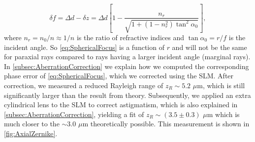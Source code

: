 \begin{equation}\label{eq:SphericalFocus}
    \delta f = \Delta d - \delta z = \Delta d \left[
    1 - \frac{n_r}{\sqrt{1+(1-n_r^2)\tan^2{\alpha_0}}}
    \right],
\end{equation}
where $n_r=n_0/n\approx1/n$ is the ratio of refractive indices and $\tan{\alpha_0} = r/f$ is the incident angle. 
So \cref{eq:SphericalFocus} is a function of $r$ and will not be the same for paraxial rays compared to rays having a larger incident angle (marginal rays). 
In \cref{subsec:AberrationCorrection} we explain how we computed the corresponding phase error of \cref{eq:SphericalFocus}, which we corrected using the \ac{SLM}.
After correction, we measured a reduced Rayleigh range of $z_R \sim 5.2$ $\mu$m, which is still significantly larger than the result from theory. 
Subsequently, we applied an extra cylindrical lens to the SLM to correct astigmatism, which is also explained in \cref{subsec:AberrationCorrection}, yielding a fit of $z_R \sim (3.5 \pm 0.3)$ $\mu$m which is much closer to the $\sim 3.0$ $\mu$m theoretically possible.
This measurement is shown in \cref{fig:AxialZernike}.




















